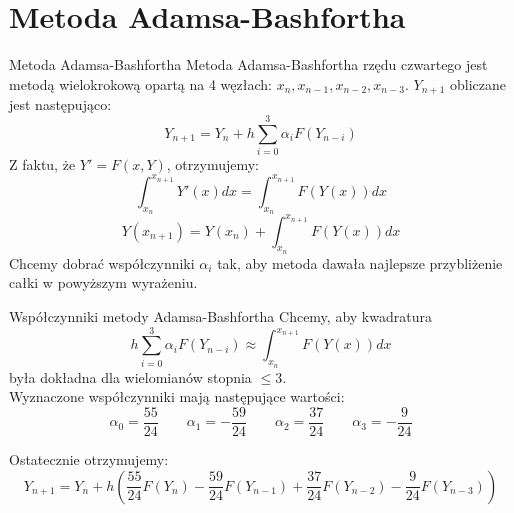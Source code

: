 \documentclass[9pt]{beamer}
\begin{document}
\section{Metoda Adamsa-Bashfortha}
\begin{frame}{Metoda Adamsa-Bashfortha}
    Metoda Adamsa-Bashfortha rzędu czwartego jest metodą wielokrokową opartą na 4 węzłach: $x_n, x_{n-1}, x_{n-2}, x_{n-3}$.
    $Y_{n+1}$ obliczane jest następująco:
    \[Y_{n+1} = Y_n + h\sum\limits^{3}_{i=0}\alpha_iF(Y_{n-i})\]
    Z faktu, że $Y' = F(x,Y)$, otrzymujemy:
    \[ \int_{x_n}^{x_{n+1}}Y'(x)dx = \int_{x_n}^{x_{n+1}}F(Y(x))dx \]
    \[ Y(x_{n+1}) = Y(x_n) + \int_{x_n}^{x_{n+1}}F(Y(x))dx \]
    Chcemy dobrać współczynniki $\alpha_i$ tak, aby metoda dawała najlepsze przybliżenie całki w powyższym wyrażeniu.
\end{frame}

\begin{frame}{Współczynniki metody Adamsa-Bashfortha}
    Chcemy, aby kwadratura 
    \[ h\sum\limits^{3}_{i=0}\alpha_iF(Y_{n-i}) \approx 
    \int_{x_n}^{x_{n+1}}F(Y(x))dx \]
    była dokładna dla wielomianów stopnia $\leq 3$.\\

    Wyznaczone współczynniki mają następujące wartości:
    \[ \alpha_0 = \dfrac{55}{24} \qquad \alpha_1 = -\dfrac{59}{24} \qquad \alpha_2 = \dfrac{37}{24} \qquad \alpha_3 = -\dfrac{9}{24}\]

    Ostatecznie otrzymujemy:
    \[ Y_{n+1} = Y_n + h \left( \dfrac{55}{24}F(Y_n) - \dfrac{59}{24}F(Y_{n-1}) + \dfrac{37}{24}F(Y_{n-2}) - \dfrac{9}{24}F(Y_{n-3})  \right) \]
\end{frame}
\end{document}
